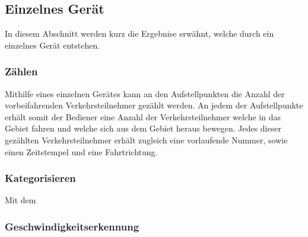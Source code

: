 \subsection{Einzelnes Gerät}
In diesem Abschnitt werden kurz die Ergebnise erwähnt, welche durch ein einzelnes Gerät entstehen. 
\subsubsection{Zählen}
Mithilfe eines einzelnen Gerätes kann an den Aufstellpunkten die Anzahl der vorbeifahrenden Verkehrsteilnehmer gezählt werden. An jedem der Aufstellpunkte erhält somit der Bediener eine Anzahl der Verkehrsteilnehmer welche in das Gebiet fahren und welche sich aus dem Gebiet heraus bewegen. Jedes dieser gezählten Verkehrsteilnehmer erhält zugleich eine vorlaufende Nummer, sowie einen Zeitstempel und eine Fahrtrichtung.
\subsubsection{Kategorisieren}
Mit dem 
\subsubsection{Geschwindigkeitserkennung}
